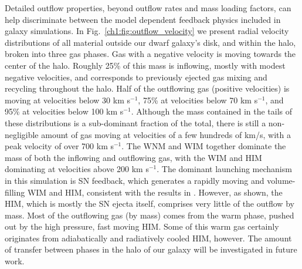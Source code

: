 Detailed outflow properties, beyond outflow rates and mass loading factors, can help discriminate between the model dependent feedback physics included in galaxy simulations. In Fig.~\ref{ch1:fig:outflow_velocity} we present radial velocity distributions of all material outside our dwarf galaxy's disk, and within the halo, broken into three gas phases. Gas with a negative velocity is moving towards the center of the halo. Roughly 25\% of this mass is inflowing, mostly with modest negative velocities, and corresponds to previously ejected gas mixing and recycling throughout the halo. Half of the outflowing gas (positive velocities) is moving at velocities below 30 km s$^{-1}$, 75\% at velocities below 70 km s$^{-1}$, and 95\% at velocities below 100 km s$^{-1}$. Although the mass contained in the tails of these distributions is a sub-dominant fraction of the total, there is still a non-negligible amount of gas moving at velocities of a few hundreds of km/s, with a peak velocity of over 700 km s$^{-1}$. The WNM and WIM together dominate the mass of both the inflowing and outflowing gas, with the WIM and HIM dominating at velocities above 200 km s$^{-1}$. The dominant launching mechanism in this simulation is SN feedback, which generates a rapidly moving and volume-filling WIM and HIM, consistent with the results in \citet{Hu2016,Hu2017}. However, as shown, the HIM, which is mostly the SN ejecta itself, comprises very little of the outflow by mass. Most of the outflowing gas (by mass) comes from the warm phase, pushed out by the high pressure, fast moving HIM. Some of this warm gas certainly originates from adiabatically and radiatively cooled HIM, however. The amount of transfer between phases in the halo of our galaxy will be investigated in future work.


